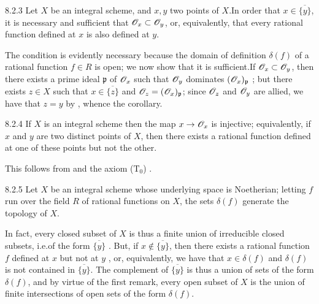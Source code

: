 \documentclass{book}
\begin{document}
\begin{envs}[Corollary]{8.2.3}
\label{cor-1.8.2.3}
Let $X$ be an integral scheme, and $x,y$ two
points of $X$.In order that $x\in\overline{\{y\}}$, it is necessary and
sufficient that $\mathscr{O}_x\subset\mathscr{O}_y$, or, equivalently, that every rational
function defined at $x$ is also defined at $y$.
\end{envs}

The condition is evidently necessary because the domain of definition
$\delta(f)$ of a rational function $f\in R$ is open; we now show that it is
sufficient.If $\mathscr{O}_x\subset\mathscr{O}_y$, then there exists a prime ideal
$\mathfrak{p}$ of $\mathscr{O}_x$ such that $\mathscr{O}_y$ dominates $(\mathscr{O}_x)_\mathfrak{p}$
; but  there exists $z\in X$ such that
$x\in\overline{\{z\}}$ and $\mathscr{O}_z=(\mathscr{O}_x)_\mathfrak{p}$; since $\mathscr{O}_z$ and $\mathscr{O}_y$
are allied, we have that $z=y$ by , whence the corollary.

\begin{envs}[Corollary]{8.2.4}
\label{cor-1.8.2.4}
If $X$ is an integral scheme then the map
$x\to\mathscr{O}_x$ is injective; equivalently, if $x$ and $y$ are two distinct points of
$X$, then there exists a rational function defined at one of these points but
not the other.
\end{envs}

This follows from  and the axiom ($\mathrm{T}_0$)
.

\begin{envs}[Corollary]{8.2.5}
\label{cor-1.8.2.5}
Let $X$ be an integral scheme whose underlying
space is Noetherian; letting $f$ run over the field $R$ of rational functions on
$X$, the sets $\delta(f)$ generate the topology of $X$.
\end{envs}

In fact, every closed subset of $X$ is thus a finite union of irreducible closed
subsets, i.e.of the form $\overline{\{y\}}$ . But, if
$x\not\in\overline{\{y\}}$, then there exists a rational function $f$ defined at
$x$ but not at $y$ , or, equivalently, we have that $x\in\delta(f)$
and $\delta(f)$ is not contained in $\overline{\{y\}}$. The complement  of
$\overline{\{y\}}$ is thus a union of sets of the form $\delta(f)$, and by
virtue of the first remark, every open subset of $X$ is the union of finite
intersections of open sets of the form $\delta(f)$.
\end{document}
